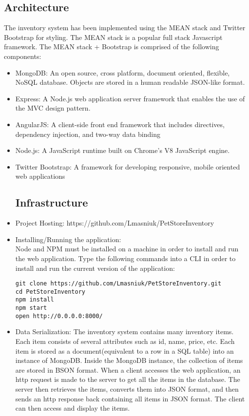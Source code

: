 \documentclass[letterpaper, 12pt]{article}
\begin{document}
\subsection{Architecture}
\noindent The inventory system has been implemented using the MEAN stack and Twitter Bootstrap for styling. The MEAN stack is a popular full stack Javascript framework. The MEAN stack + Bootstrap is comprised of the following components:
\begin{itemize}
\item MongoDB: An open source, cross platform, document oriented, flexible, NoSQL database. Objects are stored in a human readable JSON-like format.
\item Express: A Node.js web application server framework that enables the use of the MVC design pattern.
\item AngularJS: A client-side front end framework that includes directives, dependency injection, and two-way data binding
\item Node.js: A JavaScript runtime built on Chrome's V8 JavaScript engine.
\item Twitter Bootstrap: A framework for developing responsive, mobile oriented web applications

\subsection{Infrastructure}

\item Project Hosting:
 https://github.com/Lmasniuk/PetStoreInventory

\item Installing/Running the application: \\
Node and NPM must be installed on a machine in order to install and run the web application. Type the following commands into a CLI in order to install and run the current version of the application:
\begin{verbatim}
git clone https://github.com/Lmasniuk/PetStoreInventory.git
cd PetStoreInventory
npm install
npm start
open http://0.0.0.0:8000/
\end{verbatim}

\item Data Serialization:
The inventory system contains many inventory items. Each item consists of several attributes such as id, name, price, etc. Each item is stored as a document(equivalent to a row in a SQL table) into an instance of MongoDB. Inside the MongoDB instance, the collection of items are stored in BSON format. When a client accesses the web application, an http request is made to the server to get all the items in the database. The server then retrieves the items, converts them into JSON format, and then sends an http response back containing all items in JSON format. The client can then access and display the items. 
\end{itemize}
\end{document}
